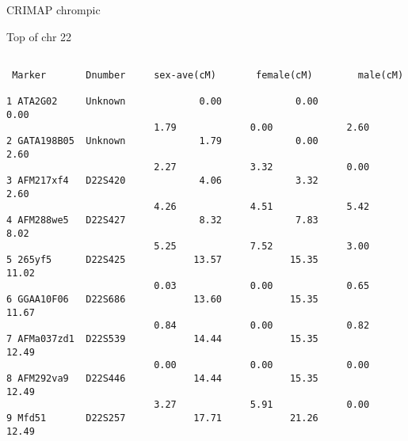 \documentclass[aspectratio=169,12pt,t]{beamer}
\begin{document}
\begin{frame}[c]{CRIMAP chrompic}
\begin{center}
{}

\end{center}


\end{frame}


\begin{frame}[fragile]{Top of chr 22}

\begin{center}

{\fontsize{8pt}{9.5}\selectfont

\begin{verbatim}

 Marker       Dnumber     sex-ave(cM)       female(cM)        male(cM)

1 ATA2G02     Unknown             0.00             0.00             0.00
                          1.79             0.00             2.60
2 GATA198B05  Unknown             1.79             0.00             2.60
                          2.27             3.32             0.00
3 AFM217xf4   D22S420             4.06             3.32             2.60
                          4.26             4.51             5.42
4 AFM288we5   D22S427             8.32             7.83             8.02
                          5.25             7.52             3.00
5 265yf5      D22S425            13.57            15.35            11.02
                          0.03             0.00             0.65
6 GGAA10F06   D22S686            13.60            15.35            11.67
                          0.84             0.00             0.82
7 AFMa037zd1  D22S539            14.44            15.35            12.49
                          0.00             0.00             0.00
8 AFM292va9   D22S446            14.44            15.35            12.49
                          3.27             5.91             0.00
9 Mfd51       D22S257            17.71            21.26            12.49
\end{verbatim}

}
\end{center}


\end{frame}
\end{document}
